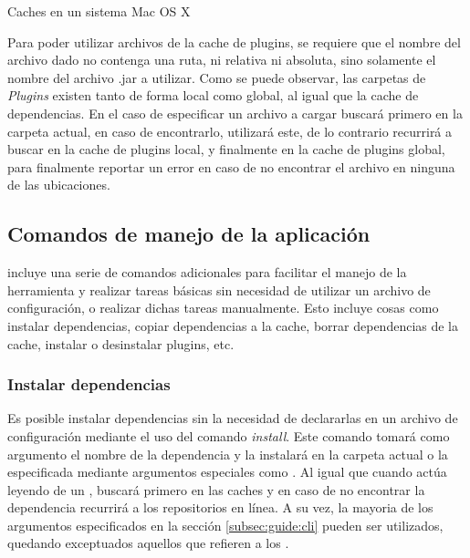 \begin{folders}[h]
	\caption{Caches en un sistema Mac OS X}
	\label{folders:plugins:osx}
\end{folders}

Para poder utilizar archivos de la cache de plugins, se requiere
que el nombre del archivo dado no contenga una ruta, ni relativa ni absoluta,
sino solamente el nombre del archivo .jar a utilizar. Como se puede observar,
las carpetas de \emph{Plugins} existen tanto de forma local como global, al
igual que la cache de dependencias. En el caso de especificar un archivo a cargar
\fronttier buscará primero en la carpeta actual, en caso de encontrarlo, utilizará
este, de lo contrario recurrirá a buscar en la cache de plugins local, y finalmente
en la cache de plugins global, para finalmente reportar un error en caso de no encontrar
el archivo en ninguna de las ubicaciones.\\

\subsection{Comandos de manejo de la aplicación}
\label{subsec:commands}

\fronttier incluye una serie de comandos adicionales para facilitar el manejo de
la herramienta y realizar tareas básicas sin necesidad de utilizar un archivo
de configuración, o realizar dichas tareas manualmente. Esto incluye cosas como
instalar dependencias, copiar dependencias a la cache, borrar dependencias de la
cache, instalar o desinstalar plugins, etc.

\subsubsection{Instalar dependencias}
\label{subsubsec:commands:install}

Es posible instalar dependencias sin la necesidad de declararlas en un archivo de
configuración mediante el uso del comando \emph{install}. Este comando tomará como
argumento el nombre de la dependencia y la instalará en la carpeta actual o la
especificada mediante argumentos especiales como . Al igual
que cuando actúa leyendo de un \conffile, \fronttier buscará primero en las caches
y en caso de no encontrar la dependencia recurrirá a los repositorios en línea.
A su vez, la mayoria de los argumentos especificados en la sección
\ref{subsec:guide:cli} pueden ser utilizados, quedando exceptuados aquellos
que refieren a los \conffiles.

